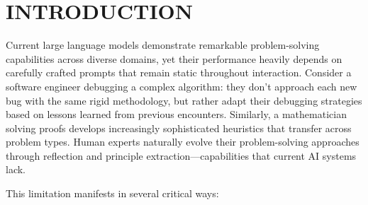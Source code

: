 \documentclass[10pt,a4paper,twocolumn]{article}
\begin{document}
\let\thefootnote\relax{}


\linebreak
\linebreak



\section{INTRODUCTION}


Current large language models demonstrate remarkable problem-solving capabilities across diverse domains, yet their performance heavily depends on carefully crafted prompts that remain static throughout interaction. Consider a software engineer debugging a complex algorithm: they don't approach each new bug with the same rigid methodology, but rather adapt their debugging strategies based on lessons learned from previous encounters. Similarly, a mathematician solving proofs develops increasingly sophisticated heuristics that transfer across problem types. Human experts naturally evolve their problem-solving approaches through reflection and principle extraction—capabilities that current AI systems lack.

This limitation manifests in several critical ways:
\end{document}
